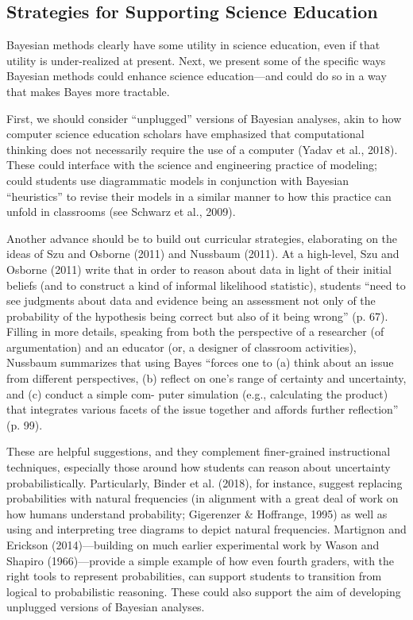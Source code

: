 \documentclass[man]{apa7}
\begin{document}
\subsection{Strategies for Supporting Science Education}

Bayesian methods clearly have some utility in science education, even if that utility is under-realized at present. Next, we present some of the specific ways Bayesian methods could enhance science education—and could do so in a way that makes Bayes more tractable.

First, we should consider “unplugged” versions of Bayesian analyses, akin to how computer science education scholars have emphasized that computational thinking does not necessarily require the use of a computer (Yadav et al., 2018). These could interface with the science and engineering practice of modeling; could students use diagrammatic models in conjunction with Bayesian “heuristics” to revise their models in a similar manner to how this practice can unfold in classrooms (see Schwarz et al., 2009). 

Another advance should be to build out curricular strategies, elaborating on the ideas of Szu and Osborne (2011) and Nussbaum (2011). At a high-level, Szu and Osborne (2011) write that in order to reason about data in light of their initial beliefs (and to construct a kind of informal likelihood statistic), students “need to see judgments about data and evidence being an assessment not only of the probability of the hypothesis being correct but also of it being wrong” (p. 67). Filling in more details, speaking from both the perspective of a researcher (of argumentation) and an educator (or, a designer of classroom activities), Nussbaum summarizes that using Bayes “forces one to (a) think about an issue from different perspectives, (b) reflect on one’s range of certainty and uncertainty, and (c) conduct a simple com- puter simulation (e.g., calculating the product) that integrates various facets of the issue together and affords further reflection” (p. 99). 

These are helpful suggestions, and they complement finer-grained instructional techniques, especially those around how students can reason about uncertainty probabilistically. Particularly, Binder et al. (2018), for instance, suggest replacing probabilities with natural frequencies (in alignment with a great deal of work on how humans understand probability; Gigerenzer & Hoffrange, 1995) as well as using and interpreting tree diagrams to depict natural frequencies. Martignon and Erickson (2014)—building on much earlier experimental work by Wason and Shapiro (1966)—provide a simple example of how even fourth graders, with the right tools to represent probabilities, can support students to transition from logical to probabilistic reasoning. These could also support the aim of developing unplugged versions of Bayesian analyses. 
\end{document}
